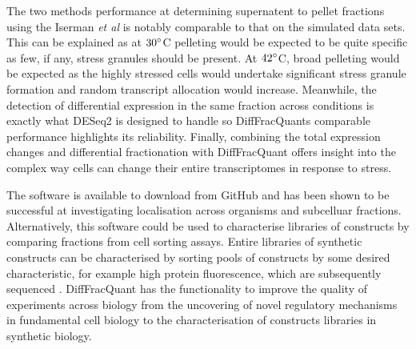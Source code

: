\documentclass[../main.tex]{subfiles}
\begin{document}
The two methods performance at determining supernatent to pellet fractions using the Iserman \textit{et al} is notably comparable to that on the simulated data sets. 
This can be explained as at $30\degree$C pelleting would be expected to be quite specific as few, if any, stress granules should be present.
At $42\degree$C, broad pelleting would be expected as the highly stressed cells would undertake significant stress granule formation and random transcript allocation would increase. 
Meanwhile, the detection of differential expression in the same fraction across conditions is exactly what DESeq2 is designed to handle so DiffFracQuants comparable performance highlights its reliability.
Finally, combining the total expression changes and differential fractionation with DiffFracQuant offers insight into the complex way cells can change their entire transcriptomes in response to stress.

The software is available to download from GitHub and has been shown to be successful at investigating localisation across organisms and subcelluar fractions.
Alternatively, this software could be used to characterise libraries of constructs by comparing fractions from cell sorting assays.
Entire libraries of synthetic constructs can be characterised by sorting pools of constructs by some desired characteristic, for example high protein fluorescence, which are subsequently sequenced \parencite{Sharon2012}. 
DiffFracQuant has the functionality to improve the quality of experiments across biology from the uncovering of novel regulatory mechanisms in fundamental cell biology to the characterisation of constructs libraries in synthetic biology.
\end{document}
